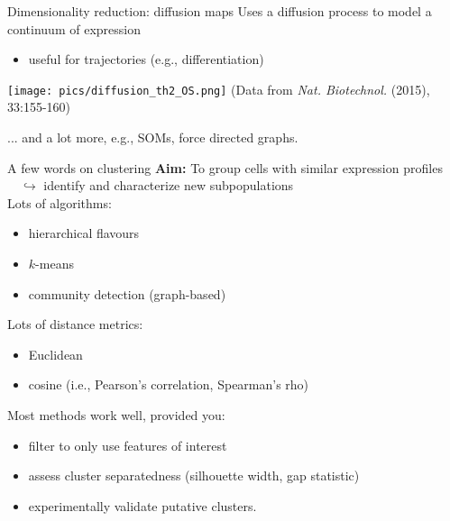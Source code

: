 \documentclass{beamer}
\begin{document}
\begin{frame}{Dimensionality reduction: diffusion maps}
Uses a diffusion process to model a continuum of expression
\begin{itemize}
    \item useful for trajectories (e.g., differentiation)
\end{itemize}
\begin{center}
    \texttt{[image: pics/diffusion\_th2\_OS.png]} 
    {\tiny (Data from \emph{Nat. Biotechnol.} (2015), 33:155-160)}
\end{center}
... and a lot more, e.g., SOMs, force directed graphs.
\end{frame}

\begin{frame}{A few words on clustering}
    \textbf{Aim:} To group cells with similar expression profiles \\
    $\quad\hookrightarrow$ identify and characterize new subpopulations\\[0.15in]

   Lots of algorithms:
\begin{itemize}
    \item hierarchical flavours
    \item $k$-means
    \item community detection (graph-based)
\end{itemize}
\vspace{0.1in}
Lots of distance metrics:
\begin{itemize}
    \item Euclidean
    \item cosine (i.e., Pearson's correlation, Spearman's rho)
\end{itemize}
\vspace{0.1in}
Most methods work well, provided you:
\begin{itemize}
    \item filter to only use features of interest
    \item assess cluster separatedness (silhouette width, gap statistic)
    \item experimentally validate putative clusters.
\end{itemize}
\end{frame}
\end{document}

